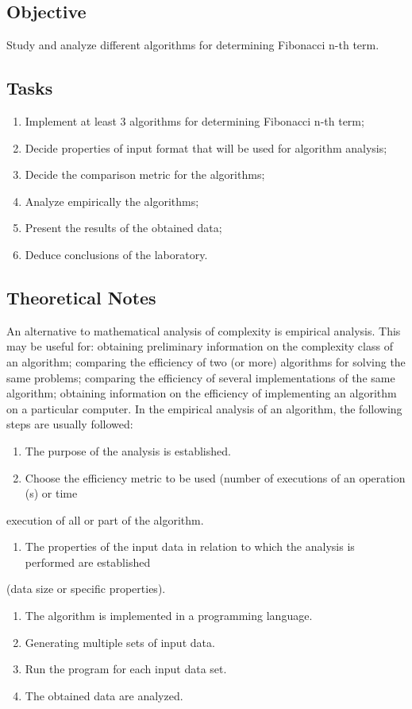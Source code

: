 \documentclass[a4paper,12pt]{article}
\begin{document}
\subsection{Objective}
\label{sec:org30082b6}
Study and analyze different algorithms for determining Fibonacci n-th term.
\subsection{Tasks}
\label{sec:orgbfdde1a}
\begin{enumerate}
\item Implement at least 3 algorithms for determining Fibonacci n-th term;
\item Decide properties of input format that will be used for algorithm analysis;
\item Decide the comparison metric for the algorithms;
\item Analyze empirically the algorithms;
\item Present the results of the obtained data;
\item Deduce conclusions of the laboratory.
\end{enumerate}
\subsection{Theoretical Notes}
\label{sec:org41d3a40}
An alternative to mathematical analysis of complexity is empirical analysis.
This may be useful for: obtaining preliminary information on the complexity class of an
algorithm; comparing the efficiency of two (or more) algorithms for solving the same problems;
comparing the efficiency of several implementations of the same algorithm; obtaining information on the
efficiency of implementing an algorithm on a particular computer.
In the empirical analysis of an algorithm, the following steps are usually followed:
\begin{enumerate}
\item The purpose of the analysis is established.
\item Choose the efficiency metric to be used (number of executions of an operation (s) or time
\end{enumerate}
execution of all or part of the algorithm.
\begin{enumerate}
\item The properties of the input data in relation to which the analysis is performed are established
\end{enumerate}
(data size or specific properties).
\begin{enumerate}
\item The algorithm is implemented in a programming language.
\item Generating multiple sets of input data.
\item Run the program for each input data set.
\item The obtained data are analyzed.
\end{enumerate}
\end{document}
